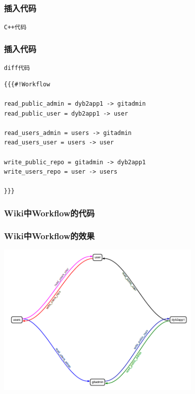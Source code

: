 \begin{frame}
    \frametitle{插入代码}
    \begin{block}{\tt{C++}代码}
        \par\usebox{\TracWikiCodeCpp}
    \end{block}
\end{frame}

\begin{frame}
    \frametitle{插入代码}
    \begin{block}{\tt{diff}代码}
        \par\usebox{\TracWikiCodeDiff}
    \end{block}
\end{frame}

\newsavebox{\TracWikiWorkflow}
\begin{lrbox}{\TracWikiWorkflow}
\begin{lstlisting}
{{{#!Workflow

read_public_admin = dyb2app1 -> gitadmin
read_public_user = dyb2app1 -> user

read_users_admin = users -> gitadmin
read_users_user = users -> user

write_public_repo = gitadmin -> dyb2app1
write_users_repo = user -> users

}}}
\end{lstlisting}
\end{lrbox}

\begin{frame}
    \frametitle{Wiki中Workflow的代码}
    \par\usebox{\TracWikiWorkflow}
\end{frame}

\begin{frame}
    \frametitle{Wiki中Workflow的效果}
    \includegraphics[width=10cm,keepaspectratio]{data/TracWorkflow.png}
\end{frame}


